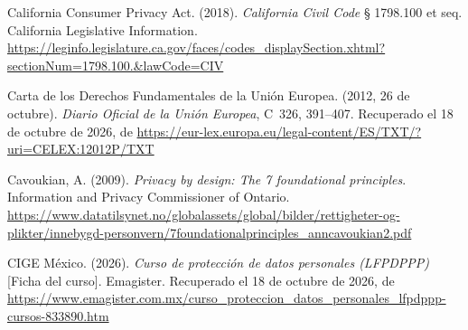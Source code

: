 \documentclass[12pt, a4paper]{article}
\begin{document}
\begin{list}{}{\setlength{\leftmargin}{1.27cm}\setlength{\itemindent}{-1.27cm}%
  \setlength{\labelwidth}{0pt}\setlength{\labelsep}{0pt}\setlength{\itemsep}{6pt}}

\item California Consumer Privacy Act. (2018). \textit{California
  Civil Code} § 1798.100 et seq. California Legislative Information. \url{https://leginfo.legislature.ca.gov/faces/codes_displaySection.xhtml?sectionNum=1798.100.&lawCode=CIV}


\item Carta de los Derechos Fundamentales de la Unión Europea.
  (2012, 26 de octubre). \textit{Diario Oficial de la Unión
  Europea}, C~326, 391--407. Recuperado el 18 de octubre de 2026, de \url{https://eur-lex.europa.eu/legal-content/ES/TXT/?uri=CELEX:12012P/TXT}
 

\item Cavoukian, A. (2009). \textit{Privacy by design: The 7
  foundational principles}. Information and Privacy Commissioner
  of Ontario.
  \url{https://www.datatilsynet.no/globalassets/global/bilder/rettigheter-og-plikter/innebygd-personvern/7foundationalprinciples_anncavoukian2.pdf}


\item CIGE México. (2026). \textit{Curso de protección de datos
  personales (LFPDPPP)} [Ficha del curso]. Emagister.
  Recuperado el 18 de octubre de 2026, de \url{https://www.emagister.com.mx/curso_proteccion_datos_personales_lfpdppp-cursos-833890.htm}
 

\end{list}
\end{document}
